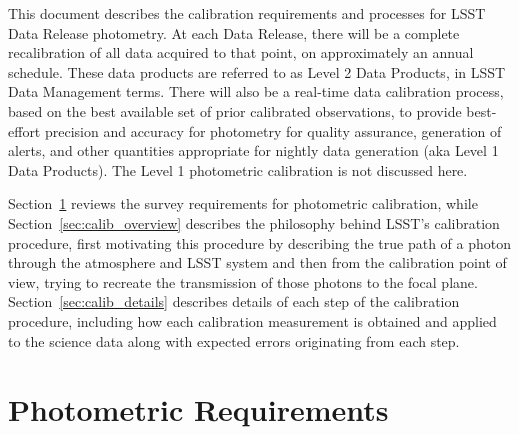 \documentclass[12pt,preprint]{aastex}
\begin{document}
This document describes the calibration requirements and processes for
LSST Data Release photometry. At each Data Release, there will be a
complete recalibration of all data acquired to that point, on
approximately an annual schedule.  These data products are referred to
as Level 2 Data Products, in LSST Data Management terms.  There will
also be a real-time data calibration process, based on the best
available set of prior calibrated observations, to provide best-effort
precision and accuracy for photometry for quality assurance,
generation of alerts, and other quantities appropriate for nightly
data generation (aka Level 1 Data Products).  The Level 1 photometric
calibration is not discussed here.

Section~\ref{sec:photoreq} reviews the survey requirements for
photometric calibration, while Section~\ref{sec:calib_overview}
describes the philosophy behind LSST's calibration procedure, first
motivating this procedure by describing the true path of a photon
through the atmosphere and LSST system and then from the calibration
point of view, trying to recreate the transmission of those photons to
the focal plane.  Section~\ref{sec:calib_details} describes details of
each step of the calibration procedure, including how each calibration
measurement is obtained and applied to the science data along with
expected errors originating from each step.


\section{Photometric Requirements}
\label{sec:photoreq}
\end{document}
